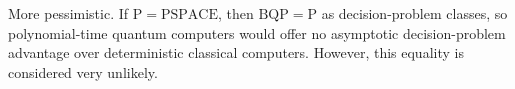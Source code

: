 \textcolor{funblue}{More pessimistic}.
If
\(
\mathrm{P}=\mathrm{PSPACE}
\),
then
\(
\mathrm{BQP}=\mathrm{P}
\)
as decision-problem classes, so polynomial-time quantum computers would offer no asymptotic decision-problem advantage over deterministic classical computers.
However, this equality is considered very unlikely.







\clearpage





